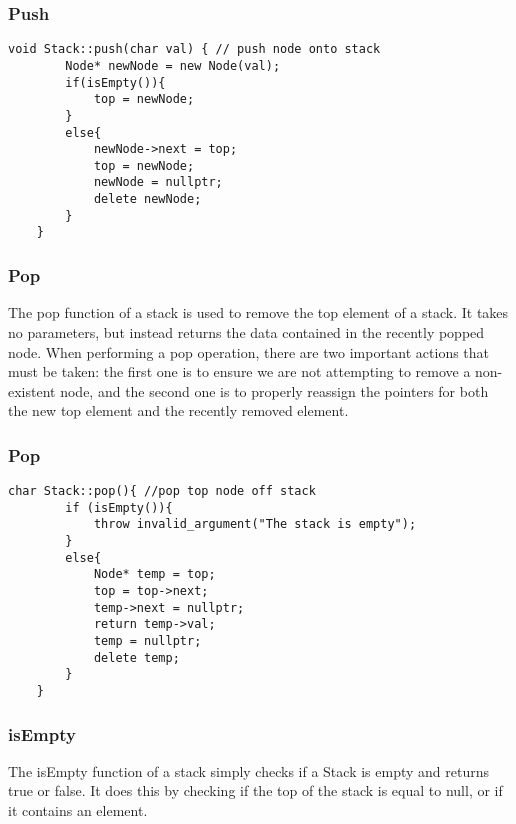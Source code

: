 \documentclass[letterpaper, 10pt,DIV=13]{scrartcl}
\numberwithin{equation}{section} %
\numberwithin{figure}{section} %
\numberwithin{table}{section} %
\begin{document}
\subsubsection*{Push}
    \lstset{numbers=left, numberstyle=\tiny, stepnumber=1, numbersep=5pt, basicstyle=\footnotesize\ttfamily}
    \begin{lstlisting}[frame=single, ]
    void Stack::push(char val) { // push node onto stack
        Node* newNode = new Node(val);
        if(isEmpty()){
            top = newNode;
        }
        else{
            newNode->next = top;
            top = newNode;
            newNode = nullptr;
            delete newNode;
        }
    }

\end{lstlisting}
\subsubsection{Pop}
The pop function of a stack is used to remove the top element of a stack. It takes no parameters, but instead returns the data contained in the recently popped node. When performing a pop operation, there are two important actions that must be taken: the first one is to ensure we are not attempting to remove a non-existent node, and the second one is to properly reassign the pointers for both the new top element and the recently removed element.

\pagebreak

\subsubsection*{Pop}
    \lstset{numbers=left, numberstyle=\tiny, stepnumber=1, numbersep=5pt, basicstyle=\footnotesize\ttfamily}
    \begin{lstlisting}[frame=single, ]
    char Stack::pop(){ //pop top node off stack
        if (isEmpty()){
            throw invalid_argument("The stack is empty");
        }
        else{
            Node* temp = top;
            top = top->next;
            temp->next = nullptr;
            return temp->val;
            temp = nullptr;
            delete temp;
        }
    }

\end{lstlisting}
\subsubsection{isEmpty}
The isEmpty function of a stack simply checks if a Stack is empty and returns true or false.  It does this by checking if the top of the stack is equal to null, or if it contains an element.
\end{document}
